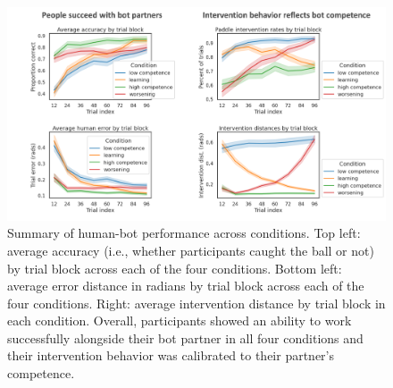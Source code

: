 \documentclass[10pt,letterpaper]{article}
\begin{document}
\begin{figure}[H]
\begin{center}
\includegraphics[width=\linewidth]{img/results-summary.png}
\end{center}
\caption{Summary of human-bot performance across conditions. Top left: average accuracy (i.e., whether participants caught the ball or not) by trial block across each of the four conditions. Bottom left: average error distance in radians by trial block across each of the four conditions. Right: average intervention distance by trial block in each condition. Overall, participants showed an ability to work successfully alongside their bot partner in all four conditions and their intervention behavior was calibrated to their partner's competence.} 
\label{fig:results_summary}
\end{figure}
\end{document}

